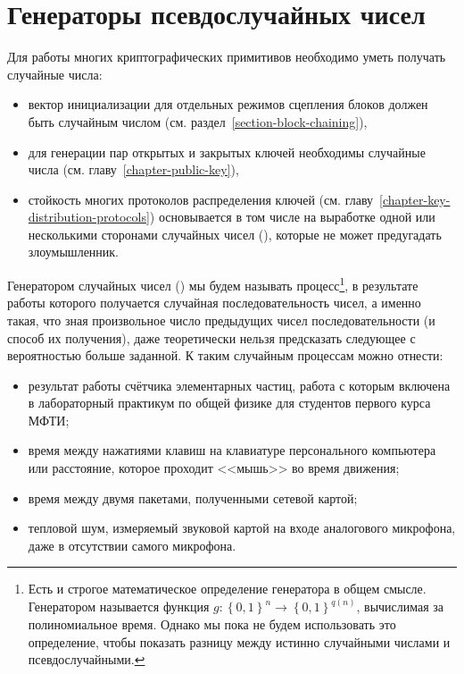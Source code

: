 \chapter{Генераторы псевдослучайных чисел}\label{chapter-generators}

Для работы многих криптографических примитивов необходимо уметь получать случайные числа:
\begin{itemize}
	\item вектор инициализации для отдельных режимов сцепления блоков должен быть случайным числом (см. раздел~\ref{section-block-chaining}),
	\item для генерации пар открытых и закрытых ключей необходимы случайные числа (см. главу~\ref{chapter-public-key}),
	\item стойкость многих протоколов распределения ключей (см. главу~\ref{chapter-key-distribution-protocols}) основывается в том числе на выработке одной или несколькими сторонами случайных чисел (), которые не может предугадать злоумышленник.
\end{itemize}

Генератором случайных чисел () мы будем называть процесс\footnote{Есть и строгое математическое определение генератора в общем смысле. Генератором называется функция $g: \left\{0, 1\right\}^{n} \to \left\{0, 1\right\}^{q\left(n\right)}$, вычислимая за полиномиальное время. Однако мы пока не будем использовать это определение, чтобы показать разницу между истинно случайными числами и псевдослучайными.}, в результате работы которого получается случайная последовательность чисел, а именно такая, что зная произвольное число предыдущих чисел последовательности (и способ их получения), даже теоретически нельзя предсказать следующее с вероятностью больше заданной. К таким случайным процессам можно отнести:

\begin{itemize}
	\item результат работы счётчика элементарных частиц, работа с которым включена в лабораторный практикум по общей физике для студентов первого курса МФТИ;
	\item время между нажатиями клавиш на клавиатуре персонального компьютера или расстояние, которое проходит <<мышь>> во время движения;
	\item время между двумя пакетами, полученными сетевой картой;
	\item тепловой шум, измеряемый звуковой картой на входе аналогового микрофона, даже в отсутствии самого микрофона.
\end{itemize}

